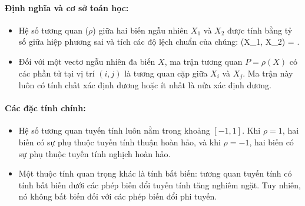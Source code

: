 \paragraph{Định nghĩa và cơ sở toán học:}
\begin{itemize}
    \item Hệ số tương quan ($\rho$) giữa hai biến ngẫu nhiên $X_1$ và $X_2$ được tính bằng tỷ số giữa hiệp phương sai và tích các độ lệch chuẩn của chúng:
    \bea
    \rho(X_1, X_2) =  .
    \eea
    \item Đối với một vectơ ngẫu nhiên đa biến $X$, ma trận tương quan $P = \rho(X)$ có các phần tử tại vị trí $(i,j)$ là tương quan cặp giữa $X_i$ và $X_j$. Ma trận này luôn có tính chất xác định dương hoặc ít nhất là nửa xác định dương.
\end{itemize}

\paragraph{Các đặc tính chính:}
\begin{itemize}
    \item Hệ số tương quan tuyến tính luôn nằm trong khoảng $[-1, 1]$. Khi $\rho = 1$, hai biến có sự phụ thuộc tuyến tính thuận hoàn hảo, và khi $\rho = -1$, hai biến có sự phụ thuộc tuyến tính nghịch hoàn hảo.
    \item Một thuộc tính quan trọng khác là tính bất biến: tương quan tuyến tính có tính bất biến dưới các phép biến đổi tuyến tính tăng nghiêm ngặt. Tuy nhiên, nó không bất biến đối với các phép biến đổi phi tuyến.
\end{itemize}

